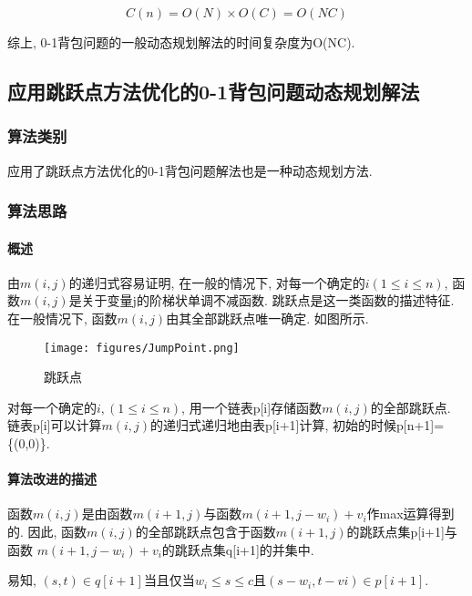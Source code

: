 \begin{equation}
	C(n) = O(N)\times O(C) = O(NC)
\end{equation}

综上, 0-1背包问题的一般动态规划解法的时间复杂度为O(NC).

\subsection{应用跳跃点方法优化的0-1背包问题动态规划解法}
\subsubsection{算法类别}
应用了跳跃点方法优化的0-1背包问题解法也是一种动态规划方法.

\subsubsection{算法思路}
\label{sec:jumpPointThink}
\paragraph{概述}
由$m(i, j)$的递归式容易证明, 在一般的情况下, 对每一个确定的$i(1\leq i\leq n)$,
函数$m(i, j)$是关于变量j的阶梯状单调不减函数. 跳跃点是这一类函数的描述特征.
在一般情况下, 函数$m(i, j)$由其全部跳跃点唯一确定. 如图所示.

\begin{figure}[ht!]
	\centering
	\texttt{[image: figures/JumpPoint.png]}
	\caption{跳跃点}
	\label{fig:JumpPoint}
\end{figure}

对每一个确定的$i,(1\leq i\leq n)$, 用一个链表p[i]存储函数$m(i,j)$的全部跳跃点.
链表p[i]可以计算$m(i,j)$的递归式递归地由表p[i+1]计算,
初始的时候p[n+1]=\{(0,0)\}.

\paragraph{算法改进的描述}
函数$m(i,j)$是由函数$m(i+1,j)$与函数$m(i+1, j-w_i)+v_i$作max运算得到的. 因此,
函数$m(i,j)$的全部跳跃点包含于函数$m(i+1,j)$的跳跃点集p[i+1]与函数
$m(i+1,j-w_i)+v_i$的跳跃点集q[i+1]的并集中.\par

易知, $(s,t)\in q[i+1]$当且仅当$w_i\leq s\leq c$且$(s-w_i,t-v{i})\in p[i+1]$. \par

